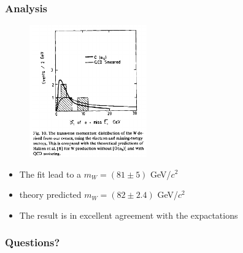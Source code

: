 \documentclass{beamer}
\begin{document}
\begin{frame}
	\frametitle{Analysis}
	\begin{figure}
		\includegraphics[width=0.45\textwidth]{result}
	\end{figure}
	\begin{itemize}
		\item The fit lead to a $m_W = (81 \pm 5)$ GeV/$c^2$
		\item theory predicted $m_W = (82 \pm 2.4)$ GeV/$c^2$
		\item The result is in excellent agreement with the expactations
	\end{itemize}
\end{frame}

\begin{frame}
	\frametitle{Questions?}
\end{frame}



\end{document}
